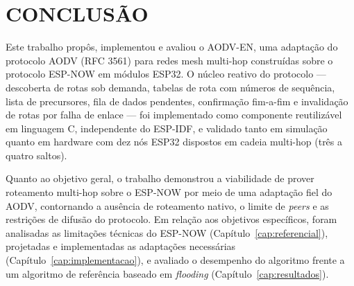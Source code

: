 \chapter{CONCLUSÃO}\label{cap:conclusao}

Este trabalho propôs, implementou e avaliou o AODV-EN, uma adaptação do protocolo
AODV (RFC 3561) para redes mesh multi-hop construídas sobre o protocolo ESP-NOW em
módulos ESP32. O núcleo reativo do protocolo --- descoberta de rotas sob demanda,
tabelas de rota com números de sequência, lista de precursores, fila de dados
pendentes, confirmação fim-a-fim e invalidação de rotas por falha de enlace --- foi
implementado como componente reutilizável em linguagem C, independente do ESP-IDF,
e validado tanto em simulação quanto em hardware com dez nós ESP32 dispostos
em cadeia multi-hop (três a quatro saltos).

Quanto ao objetivo geral, o trabalho demonstrou a viabilidade de prover roteamento
multi-hop sobre o ESP-NOW por meio de uma adaptação fiel do AODV, contornando a
ausência de roteamento nativo, o limite de \emph{peers} e as restrições de difusão do
protocolo. Em relação aos objetivos específicos, foram analisadas as limitações
técnicas do ESP-NOW (Capítulo~\ref{cap:referencial}), projetadas e implementadas as
adaptações necessárias (Capítulo~\ref{cap:implementacao}), e avaliado o desempenho do
algoritmo frente a um algoritmo de referência baseado em \emph{flooding}
(Capítulo~\ref{cap:resultados}).

